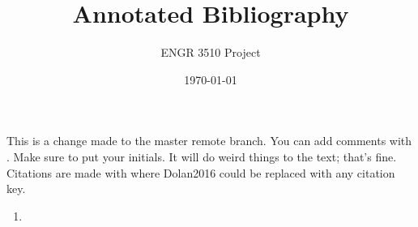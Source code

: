 \documentclass[12pt,letterpaper]{article}
\begin{document}
\title{Annotated Bibliography}
\author{ENGR 3510 Project}
\date{\today}
\maketitle

This is a change made to the master remote branch.
You can add comments with . Make sure to put your initials. It will do weird things to the text; that's fine. 
Citations are made with \cite{Dolan2016} where Dolan2016 could be replaced with any citation key. 




\begin{enumerate}
	\item \cite{Nan2013}
\end{enumerate}

\printbibliography
\end{document}
